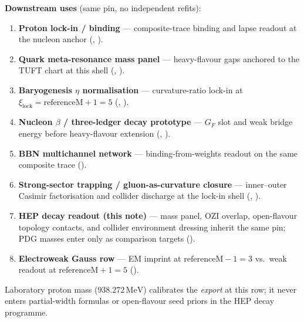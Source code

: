 \textbf{Downstream uses} (same pin, no independent refits):
\begin{enumerate}[label=\textbf{R\arabic*.},leftmargin=2.5em,nosep]
\item \textbf{Proton lock-in / binding} ---
  composite-trace binding and lapse readout at the nucleon anchor
  (,
  ).
\item \textbf{Quark meta-resonance mass panel} ---
  heavy-flavour gaps anchored to the TUFT chart at this shell
  (,
  ).
\item \textbf{Baryogenesis $\eta$ normalisation} ---
  curvature-ratio lock-in at $\xi_{\mathrm{lock}}=\mathrm{referenceM}+1=5$
  (,
  \cite{hqiv-baryogenesis-paper}).
\item \textbf{Nucleon $\beta$ / three-ledger decay prototype} ---
  $G_F$ slot and weak bridge energy before heavy-flavour extension
  (,
  \cite{hqiv-nucleon-binding-paper}).
\item \textbf{BBN multichannel network} ---
  binding-from-weights readout on the same composite trace
  (\cite{hqiv-bbn-paper}).
\item \textbf{Strong-sector trapping / gluon-as-curvature closure} ---
  inner--outer Casimir factorisation and collider discharge at the lock-in shell
  (,
  \cite{hqiv-gluon-curvature-note}).
\item \textbf{HEP decay readout (this note)} ---
  mass panel, OZI overlap, open-flavour topology contacts, and collider
  environment dressing inherit the same pin; PDG masses enter only as comparison
  targets ().
\item \textbf{Electroweak Gauss row} ---
  EM imprint at $\mathrm{referenceM}-1=3$ vs.\ weak readout at
  $\mathrm{referenceM}+1=5$
  ().
\end{enumerate}

Laboratory proton mass ($938.272\,\mathrm{MeV}$) calibrates the \emph{export}
at this row; it never enters partial-width formulas or open-flavour seed priors
in the HEP decay programme.
